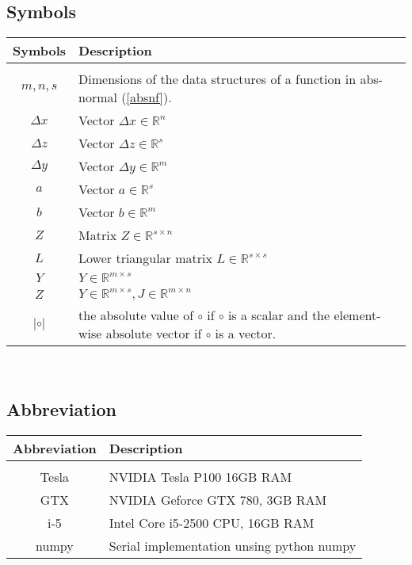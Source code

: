 \subsection{Symbols}
\begin{tabular}{c|l}
	Symbols & Description \\
	\hline \\
	 $m,n,s$ & Dimensions of the data structures of a function in abs-normal (\ref{absnf}). \\
	 $\Delta x$ & Vector $\Delta x \in \mathbb{R}^n$ \\
	 $\Delta z$ & Vector $\Delta z \in \mathbb{R}^s$ \\
	 $\Delta y$ & Vector $\Delta y \in \mathbb{R}^m$ \\
	 $a$		& Vector $a \in \mathbb{R}^s$ \\
	 $b$		& Vector $b \in \mathbb{R}^{m}$ \\
	 $Z$		& Matrix $Z \in \mathbb{R}^{s\times n}$ \\
	 $L$	    & Lower triangular matrix $L \in \mathbb{R}^{s \times s}$ \\
	 $Y$		& $Y \in \mathbb{R}^{m \times s}$ \\
	 $Z$		& $Y \in \mathbb{R}^{m \times s}, J \in \mathbb{R}^{m \times n}$ \\
	 $|\circ|$  & the absolute value of $\circ$ if $\circ$ is a scalar and the element-wise absolute vector if $\circ$ is a vector.
\end{tabular} \\

\subsection{Abbreviation}
\begin{tabular}{c|l}
	Abbreviation & Description \\
	\hline \\
	Tesla & NVIDIA Tesla P100 16GB RAM \\
	GTX & NVIDIA Geforce GTX 780, 3GB RAM \\
	i-5 & Intel Core i5-2500 CPU, 16GB RAM \\
	numpy & Serial implementation unsing python numpy
\end{tabular}